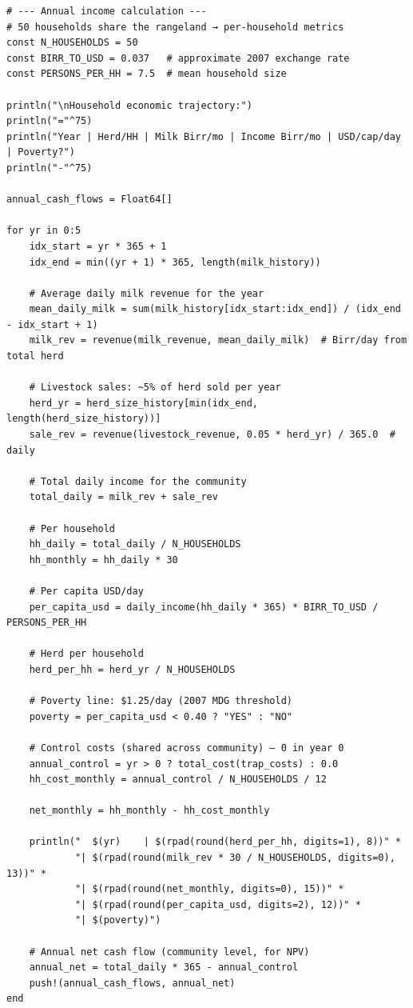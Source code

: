 \begin{verbatim}
# --- Annual income calculation ---
# 50 households share the rangeland → per-household metrics
const N_HOUSEHOLDS = 50
const BIRR_TO_USD = 0.037   # approximate 2007 exchange rate
const PERSONS_PER_HH = 7.5  # mean household size

println("\nHousehold economic trajectory:")
println("="^75)
println("Year | Herd/HH | Milk Birr/mo | Income Birr/mo | USD/cap/day | Poverty?")
println("-"^75)

annual_cash_flows = Float64[]

for yr in 0:5
    idx_start = yr * 365 + 1
    idx_end = min((yr + 1) * 365, length(milk_history))

    # Average daily milk revenue for the year
    mean_daily_milk = sum(milk_history[idx_start:idx_end]) / (idx_end - idx_start + 1)
    milk_rev = revenue(milk_revenue, mean_daily_milk)  # Birr/day from total herd

    # Livestock sales: ~5% of herd sold per year
    herd_yr = herd_size_history[min(idx_end, length(herd_size_history))]
    sale_rev = revenue(livestock_revenue, 0.05 * herd_yr) / 365.0  # daily

    # Total daily income for the community
    total_daily = milk_rev + sale_rev

    # Per household
    hh_daily = total_daily / N_HOUSEHOLDS
    hh_monthly = hh_daily * 30

    # Per capita USD/day
    per_capita_usd = daily_income(hh_daily * 365) * BIRR_TO_USD / PERSONS_PER_HH

    # Herd per household
    herd_per_hh = herd_yr / N_HOUSEHOLDS

    # Poverty line: $1.25/day (2007 MDG threshold)
    poverty = per_capita_usd < 0.40 ? "YES" : "NO"

    # Control costs (shared across community) — 0 in year 0
    annual_control = yr > 0 ? total_cost(trap_costs) : 0.0
    hh_cost_monthly = annual_control / N_HOUSEHOLDS / 12

    net_monthly = hh_monthly - hh_cost_monthly

    println("  $(yr)    | $(rpad(round(herd_per_hh, digits=1), 8))" *
            "| $(rpad(round(milk_rev * 30 / N_HOUSEHOLDS, digits=0), 13))" *
            "| $(rpad(round(net_monthly, digits=0), 15))" *
            "| $(rpad(round(per_capita_usd, digits=2), 12))" *
            "| $(poverty)")

    # Annual net cash flow (community level, for NPV)
    annual_net = total_daily * 365 - annual_control
    push!(annual_cash_flows, annual_net)
end
\end{verbatim}




